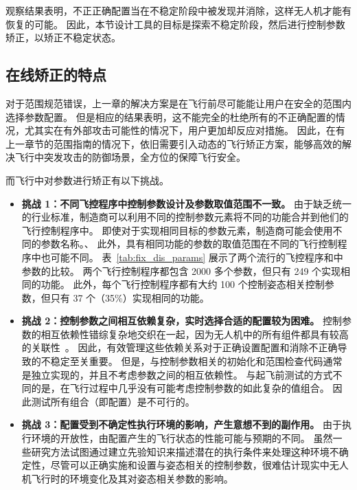 观察结果表明，不正正确配置当在不稳定阶段中被发现并消除，这样无人机才能有恢复的可能。
因此，本节设计工具的目标是探索不稳定阶段，然后进行控制参数矫正，以矫正不稳定状态。



\subsection{在线矫正的特点}
对于范围规范错误，上一章的解决方案是在飞行前尽可能能让用户在安全的范围内选择参数配置。
但是相应的结果表明，这不能完全的杜绝所有的不正确配置的情况，尤其实在有外部攻击可能性的情况下，用户更加却反应对措施。
因此，在有上一章节的范围指南的情况下，依旧需要引入动态的飞行矫正方案，能够高效的解决飞行中突发攻击的防御场景，全方位的保障飞行安全。

而飞行中对参数进行矫正有以下挑战。

\begin{itemize}
    \item \textbf{挑战 1：不同飞控程序中控制参数设计及参数取值范围不一致。}
    由于缺乏统一的行业标准，制造商可以利用不同的控制参数元素将不同的功能合并到他们的飞行控制程序中。
    即使对于实现相同目标的参数元素，制造商可能会使用不同的参数名称。、
    此外，具有相同功能的参数的取值范围在不同的飞行控制程序中也可能不同。
    表~\ref{tab:fix_dis_params} 展示了两个流行的飞控程序和中参数的比较。
    两个飞行控制程序都包含 2000 多个参数，但只有 249 个实现相同的功能。
    此外，每个飞行控制程序都有大约 100 个控制姿态相关控制参数，但只有 37 个（35\%）实现相同的功能。

    
   
    \item \textbf{挑战 2：控制参数之间相互依赖复杂，实时选择合适的配置较为困难。}
    控制参数的相互依赖性错综复杂地交织在一起，因为无人机中的所有组件都具有较高的关联性~\cite{ding2023get}。
    因此，有效管理这些依赖关系对于正确设置配置和消除不正确导致的不稳定至关重要。
    但是，与控制参数相关的初始化和范围检查代码通常是独立实现的，并且不考虑参数之间的相互依赖性。
    与起飞前测试的方式不同的是，在飞行过程中几乎没有可能考虑控制参数的如此复杂的值组合。
    因此测试所有组合（即配置）是不可行的。
    
    
    \item \textbf{挑战 3：配置受到不确定性执行环境的影响，产生意想不到的副作用。}
    由于执行环境的开放性，由配置产生的飞行状态的性能可能与预期的不同。
    虽然一些研究方法试图通过建立先验知识来描述潜在的执行条件来处理这种环境不确定性，尽管可以正确实施和设置与姿态相关的控制参数，很难估计现实中无人机飞行时的环境变化及其对姿态相关参数的影响。
     
\end{itemize}

